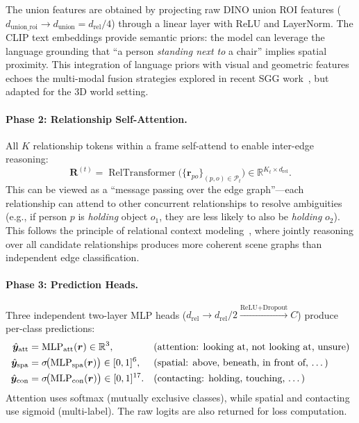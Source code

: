 \documentclass[runningheads]{llncs}
\newcommand{\mR}{\mathbb{R}}
\newcommand{\op}[1]{\operatorname{#1}}
\newcommand{\mat}[1]{\bm{#1}}
\begin{document}
The union features are obtained by projecting raw DINO union ROI features ($d_{\text{union\_roi}} \to d_{\text{union}} = d_{\text{rel}}/4$) through a linear layer with ReLU and LayerNorm.  The CLIP text embeddings provide semantic priors: the model can leverage the language grounding that ``a person \textit{standing next to} a chair'' implies spatial proximity.  This integration of language priors with visual and geometric features echoes the multi-modal fusion strategies explored in recent SGG work~\cite{lu2016visual,chen2019knowledge}, but adapted for the 3D world setting.

\paragraph{Phase 2: Relationship Self-Attention.}
All $K$ relationship tokens within a frame self-attend to enable inter-edge reasoning:
\begin{equation}
    \mat{R}^{(t)} = \op{RelTransformer}\bigl(\{\mat{r}_{po}\}_{(p,o) \in \mathcal{P}_t}\bigr) \in \mR^{K_t \times d_{\text{rel}}}.
    \label{eq:rel_attn}
\end{equation}
This can be viewed as a ``message passing over the edge graph''---each relationship can attend to other concurrent relationships to resolve ambiguities (e.g., if person $p$ is \emph{holding} object $o_1$, they are less likely to also be \emph{holding} $o_2$).  This follows the principle of relational context modeling~\cite{li2018factorizable,zellers2018neural}, where jointly reasoning over all candidate relationships produces more coherent scene graphs than independent edge classification.

\paragraph{Phase 3: Prediction Heads.}
Three independent two-layer MLP heads ($d_{\text{rel}} \!\to\! d_{\text{rel}}/2 \xrightarrow{\text{ReLU+Dropout}} C$) produce per-class predictions:
\begin{align}
    \hat{\mat{y}}_{\text{att}} &= \op{MLP}_{\text{att}}(\mat{r}) \in \mR^{3}, & &\text{(attention: looking at, not looking at, unsure)} \label{eq:att_head} \\
    \hat{\mat{y}}_{\text{spa}} &= \sigma\!\bigl(\op{MLP}_{\text{spa}}(\mat{r})\bigr) \in [0,1]^{6}, & &\text{(spatial: above, beneath, in front of, \dots)} \label{eq:spa_head} \\
    \hat{\mat{y}}_{\text{con}} &= \sigma\!\bigl(\op{MLP}_{\text{con}}(\mat{r})\bigr) \in [0,1]^{17}. & &\text{(contacting: holding, touching, \dots)} \label{eq:con_head}
\end{align}
Attention uses softmax (mutually exclusive classes), while spatial and contacting use sigmoid (multi-label).
The raw logits are also returned for loss computation.
\end{document}
